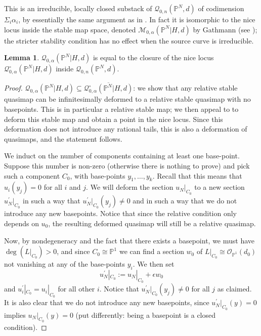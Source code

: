 \documentclass[11pt]{amsart}
\newcommand{\Q}[4]{\mathcal{Q}_{#1,#2}(#3,#4)}
\newcommand{\PP}{\mathbb P}
\newcommand{\OO}{\mathcal{O}}
\theoremstyle{definition}
\newtheorem{lem}[thm]{Lemma}
\theoremstyle{definition}
\begin{document}
This is an irreducible, locally closed substack of $\Q{0}{n}{\PP^N}{d}$ of codimension $\Sigma_i \alpha_i$, by essentially the same argument as in \cite[Lemma 1.8]{Ga}. In fact it is isomorphic to the nice locus inside the stable map space, denoted $\mathcal M_{0,\alpha}(\PP^N|H,d)$ by Gathmann (see \cite[Def. 1.6]{Ga}); the stricter stability condition has no effect when the source curve is irreducible.

\begin{lem} \label{lem:closure}
$\Q{0}{\alpha}{\PP^N|H}{d}$ is equal to the closure of the nice locus $\mathcal{Q}^{\circ}_{0,\alpha}(\PP^N|H,d)$ inside $\Q{0}{n}{\PP^N}{d}$. 
\end{lem}
\begin{proof}
$\Q{0}{\alpha}{\PP^N|H}{d}\subseteq\overline{\mathcal{Q}^{\circ}_{0,\alpha}(\PP^N|H,d)}$: we show that any relative stable quasimap can be infinitesimally deformed to a relative stable quasimap with no basepoints. This is in particular a relative stable map; we then appeal to \cite[Prop. 1.14]{Ga} to deform this stable map and obtain a point in the nice locus. Since this deformation does not introduce any rational tails, this is also a deformation of quasimaps, and the statement follows.

We induct on the number of components containing at least one base-point. Suppose this number is non-zero (otherwise there is nothing to prove) and pick such a component $C_0$, with base-points $y_1 ,\ldots, y_k$. Recall that this means that $u_i(y_j)=0$ for all $i$ and $j$. We will deform the section $u_N|_{C_0}$ to a new section $u_N^\prime|_{C_0}$ in such a way that $u_N^\prime|_{C_0}(y_j) \neq 0$ and in such a way that we do not introduce any new basepoints. Notice that since the relative condition only depends on $u_0$, the resulting deformed quasimap will still be a relative quasimap.

Now, by nondegeneracy and the fact that there exists a basepoint, we must have $\deg(L|_{C_0})>0$, and since $C_0 \cong \PP^1$ we can find a section $w_0$ of $L|_{C_0} \cong \OO_{\PP^1}(d_0)$ not vanishing at any of the base-points $y_i$.
We then set
\begin{equation*} u_N^\prime|_{C_0} := u_N|_{C_0} + \epsilon w_0 \end{equation*}
and $u_i^\prime|_{C_0} = u_i|_{C_0}$ for all other $i$. Notice that $u_N^\prime|_{C_0}(y_j) \neq 0$ for all $j$ as claimed. It is also clear that we do not introduce any new basepoints, since $u_N^\prime|_{C_0}(y) = 0$ implies $u_N|_{C_0}(y)=0$ (put differently: being a basepoint is a closed condition).


\end{proof}
\end{document}
